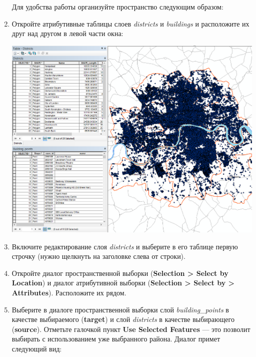 \documentclass[]{book}
\theoremstyle{definition}
\theoremstyle{definition}
\theoremstyle{definition}
\theoremstyle{remark}
\begin{document}
\begin{enumerate}
  Для удобства работы организуйте пространство следующим образом:
\item
  Откройте атрибутивные таблицы слоев \emph{districts} и
  \emph{buildings} и расположите их друг над другом в левой части окна:

  \includegraphics{images/Ex07/image16.png}
\item
  Включите редактирование слоя \emph{districts} и выберите в его таблице
  первую строчку (нужно щелкнуть на заголовке слева от строки).
\item
  Откройте диалог пространственной выборки (\textbf{Selection
  \textgreater{} Select by Location}) и диалог атрибутивной выборки
  (\textbf{Selection \textgreater{} Select by \textgreater{}
  Attributes}). Расположите их рядом.
\item
  Выберите в диалоге пространственной выборки слой
  \emph{building\_points} в качестве выбираемого (\textbf{target}) и
  слой \emph{districts} в качестве выбирающего (\textbf{source}).
  Отметьте галочкой пункт \textbf{Use Selected Features} --- это
  позволит выбирать с использованием уже выбранного района. Диалог
  примет следующий вид:


\end{enumerate}
\end{document}
